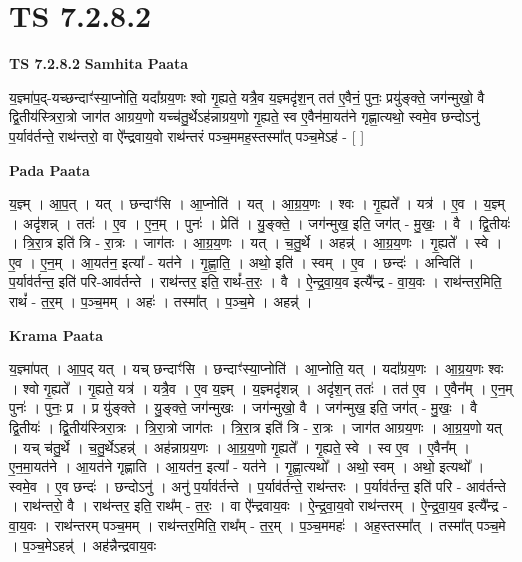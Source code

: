 \documentclass[17pt]{extarticle}
\begin{document}
\section{ TS 7.2.8.2 }

\textbf{TS 7.2.8.2 } \newline
\textbf{Samhita Paata} \newline

य॒ज्ञ्मा॑प॒द्-यच्छन्दाꣳ॑स्या॒प्नोति॒ यदा᳚ग्रय॒णः श्वो गृ॒ह्यते॒ यत्रै॒व य॒ज्ञ्मदृ॑श॒न् तत॑ ए॒वैनं॒ पुनः॒ प्रयु॑ङ्क्ते॒ जग॑न्मुखो॒ वै द्वि॒तीय॑स्त्रिरा॒त्रो जाग॑त आग्रय॒णो यच्च॑तु॒र्थेऽह॑न्नाग्रय॒णो गृ॒ह्यते॒ स्व ए॒वैन॑मा॒यत॑ने गृह्णा॒त्यथो॒ स्वमे॒व छन्दोऽनु॑ प॒र्याव॑र्तन्ते॒ राथ॑न्तरो॒ वा ऐ᳚न्द्रवाय॒वो राथ॑न्तरं पञ्च॒ममह॒स्तस्मा᳚त् पञ्च॒मेऽह॑ - [  ] \newline

\textbf{Pada Paata} \newline

य॒ज्ञ्म् । आ॒प॒त् । यत् । छन्दाꣳ॑सि । आ॒प्नोति॑ । यत् । आ॒ग्र॒य॒णः । श्वः । गृ॒ह्यते᳚ । यत्र॑ । ए॒व । य॒ज्ञ्म् । अदृ॑शन्न् । ततः॑ । ए॒व । ए॒न॒म् । पुनः॑ । प्रेति॑ । यु॒ङ्क्ते॒ । जग॑न्मुख॒ इति॒ जग॑त् - मु॒खः॒ । वै । द्वि॒तीयः॑ । त्रि॒रा॒त्र इति॑ त्रि - रा॒त्रः । जाग॑तः । आ॒ग्र॒य॒णः । यत् । च॒तु॒र्थे । अहन्न्॑ । आ॒ग्र॒य॒णः । गृ॒ह्यते᳚ । स्वे । ए॒व । ए॒न॒म् । आ॒यत॑न॒ इत्या᳚ - यत॑ने । गृ॒ह्णा॒ति॒ । अथो॒ इति॑ । स्वम् । ए॒व । छन्दः॑ । अन्विति॑ । प॒र्याव॑र्तन्त॒ इति॑ परि-आव॑र्तन्ते । राथ॑न्तर॒ इति॒ राथं᳚-त॒रः॒ । वै । ऐ॒न्द्र॒वा॒य॒व इत्यै᳚न्द्र - वा॒य॒वः । राथ॑न्तर॒मिति॒ राथं᳚ - त॒र॒म् । प॒ञ्च॒मम् । अहः॑ । तस्मा᳚त् । प॒ञ्च॒मे । अहन्न्॑ ।  \newline


\textbf{Krama Paata} \newline

य॒ज्ञ्मा॑पत् । आ॒प॒द् यत् । यच् छन्दाꣳ॑सि । छन्दाꣳ॑स्या॒प्नोति॑ । आ॒प्नोति॒ यत् । यदा᳚ग्रय॒णः । आ॒ग्र॒य॒णः श्वः । श्वो गृ॒ह्यते᳚ । गृ॒ह्यते॒ यत्र॑ । यत्रै॒व । ए॒व य॒ज्ञ्म् । य॒ज्ञ्मदृ॑शन्न् । अदृ॑श॒न् ततः॑ । तत॑ ए॒व । ए॒वैन᳚म् । ए॒न॒म् पुनः॑ । पुनः॒ प्र । प्र यु॑ङ्‍क्ते । यु॒ङ्‍क्ते॒ जग॑न्मुखः । जग॑न्मुखो॒ वै । जग॑न्मुख॒ इति॒ जग॑त् - मु॒खः॒ । वै द्वि॒तीयः॑ । द्वि॒तीय॑स्त्रिरा॒त्रः । त्रि॒रा॒त्रो जाग॑तः । त्रि॒रा॒त्र इति॑ त्रि - रा॒त्रः । जाग॑त आग्रय॒णः । आ॒ग्र॒य॒णो यत् । यच् च॑तु॒र्थे । च॒तु॒र्थेऽहन्न्॑ । अह॑न्नाग्रय॒णः । आ॒ग्र॒य॒णो गृ॒ह्यते᳚ । गृ॒ह्यते॒ स्वे । स्व ए॒व । ए॒वैन᳚म् । ए॒न॒मा॒यत॑ने । आ॒यत॑ने गृह्णाति । आ॒यत॑न॒ इत्या᳚ - यत॑ने । गृ॒ह्णा॒त्यथो᳚ । अथो॒ स्वम् । अथो॒ इत्यथो᳚ । स्वमे॒व । ए॒व छन्दः॑ । छन्दोऽनु॑ । अनु॑ प॒र्याव॑र्तन्ते । प॒र्याव॑र्तन्ते॒ राथ॑न्तरः । प॒र्याव॑र्तन्त॒ इति॑ परि - आव॑र्तन्ते । राथ॑न्तरो॒ वै । राथ॑न्तर॒ इति॒ राथ᳚म् - त॒रः॒ । वा ऐ᳚न्द्रवाय॒वः । ऐ॒न्द्र॒वा॒य॒वो राथ॑न्तरम् । ऐ॒न्द्र॒वा॒य॒व इत्यै᳚न्द्र - वा॒य॒वः । राथ॑न्तरम् पञ्च॒मम् । राथ॑न्तर॒मिति॒ राथ᳚म् - त॒र॒म् । प॒ञ्च॒ममहः॑ । अह॒स्तस्मा᳚त् । तस्मा᳚त् पञ्च॒मे । प॒ञ्च॒मेऽहन्न्॑ । अह॑न्नैन्द्रवाय॒वः \newline
\end{document}
